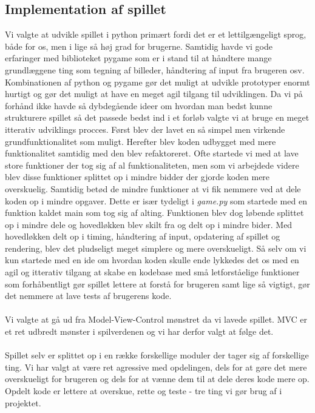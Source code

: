 \documentclass[10pt,a4paper,danish]{article}
\begin{document}
\subsection{Implementation af spillet}
Vi valgte at udvikle spillet i python primært fordi det er et lettilgængeligt sprog, både for os, men i lige så høj grad for brugerne. Samtidig havde vi gode erfaringer med biblioteket pygame som er i stand til at håndtere mange grundlæggene ting som tegning af billeder, håndtering af input fra brugeren osv.
Kombinationen af python og pygame gør det muligt at udvikle prototyper enormt hurtigt og gør det muligt at have en meget agil tilgang til udviklingen. Da vi på forhånd ikke havde så dybdegående ideer om hvordan man bedst kunne strukturere spillet så det passede bedst ind i et forløb valgte vi at bruge en meget itterativ udviklings procces. Først blev der lavet en så simpel men virkende grundfunktionalitet som muligt. Herefter blev koden udbygget med mere funktionalitet samtidig med den blev refaktoreret. Ofte startede vi med at lave store funktioner der tog sig af al funktionaliteten, men som vi arbejdede videre blev disse funktioner splittet op i mindre bidder der gjorde koden mere overskuelig. Samtidig betød de mindre funktioner at vi fik nemmere ved at dele koden op i mindre opgaver. Dette er især tydeligt i \textit{game.py} som startede med en funktion kaldet main som tog sig af alting. Funktionen blev dog løbende splittet op i mindre dele og hovedløkken blev skilt fra og delt op i mindre bider. Med hovedløkken delt op i timing, håndtering af input, opdatering af spillet og rendering, blev det pludseligt meget simplere og mere overskueligt. Så selv om vi kun startede med en ide om hvordan koden skulle ende lykkedes det os med en agil og itterativ tilgang at skabe en kodebase med små letforståelige funktioner som forhåbentligt gør spillet lettere at forstå for brugeren samt lige så vigtigt, gør det nemmere at lave tests af brugerens kode.

\paragraph{}
Vi valgte at gå ud fra Model-View-Control mønstret da vi lavede spillet. MVC er et ret udbredt mønster i spilverdenen og vi har derfor valgt at følge det. 

\paragraph{}
Spillet selv er splittet op i en række forskellige moduler der tager sig af forskellige ting. Vi har valgt at være ret agressive med opdelingen, dels for at gøre det mere overskueligt for brugeren og dels for at vænne dem til at dele deres kode mere op. Opdelt kode er lettere at overskue, rette og teste - tre ting vi gør brug af i projektet.
\end{document}
